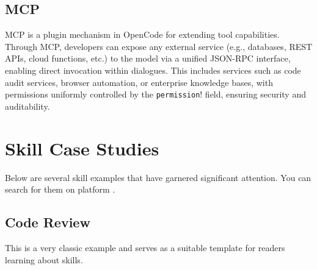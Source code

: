 \documentclass[]{article}
\newcommand{\passthrough}[1]{#1}
\newcommand{\qe}[1]{\passthrough{\lstinline!#1!}}
\newcommand{\myline}{\begin{center}\rule{0.5\linewidth}{0.5pt}\end{center}}
\begin{document}
\subsection{MCP}\label{sec:mcp}

MCP is a plugin mechanism in OpenCode for extending tool capabilities.
Through MCP, developers can expose any external service (e.g.,
databases, REST APIs, cloud functions, etc.) to the model via a unified
JSON-RPC interface, enabling direct invocation within dialogues. This
includes services such as code audit services, browser automation, or
enterprise knowledge bases, with permissions uniformly controlled by the
\qe{permission!} field, ensuring security and
auditability.


\section{Skill Case Studies}\label{sec:skill-case-studies}

Below are several skill examples that have garnered significant
attention. You can search for them on platform \cite{skills-sh}.

\subsection{Code Review}\label{sec:code-review}

This is a very classic example and serves as a suitable template for readers learning about skills.
\end{document}
